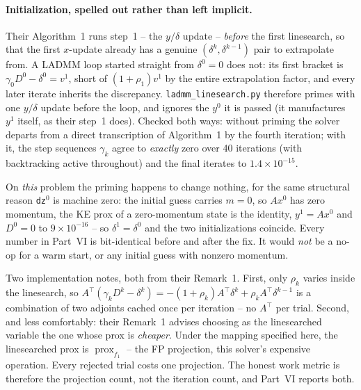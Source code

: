 \documentclass[11pt]{article}
\newcommand{\code}[1]{\texttt{#1}}
\newcommand{\prox}{\operatorname{prox}}
\begin{document}
\paragraph{Initialization, spelled out rather than left implicit.} Their
Algorithm~1 runs step~1 -- the $y/\delta$ update -- \emph{before} the first
linesearch, so that the first $x$-update already has a genuine
$(\delta^k,\delta^{k-1})$ pair to extrapolate from. A LADMM loop started
straight from $\delta^0=0$ does not: its first bracket is
$\gamma_0D^0-\delta^0=v^1$, short of $(1+\rho_1)v^1$ by the entire
extrapolation factor, and every later iterate inherits the discrepancy.
\code{ladmm\_linesearch.py} therefore primes with one $y/\delta$ update before
the loop, and ignores the $y^0$ it is passed (it manufactures $y^1$ itself, as
their step~1 does). Checked both ways: without priming the solver departs from a
direct transcription of Algorithm~1 by the fourth iteration; with it, the step
sequences $\gamma_k$ agree to \emph{exactly} zero over 40 iterations (with
backtracking active throughout) and the final iterates to $1.4\times10^{-15}$.

On \emph{this} problem the priming happens to change nothing, for the same
structural reason \code{dz}$^0$ is machine zero: the initial guess carries
$m=0$, so $Ax^0$ has zero momentum, the KE prox of a zero-momentum state is the
identity, $y^1=Ax^0$ and $D^0=0$ to $9\times10^{-16}$ -- so $\delta^1=\delta^0$
and the two initializations coincide. Every number in Part~VI is bit-identical
before and after the fix. It would \emph{not} be a no-op for a warm start, or
any initial guess with nonzero momentum.

Two implementation notes, both from their Remark~1. First, only $\rho_k$ varies
inside the linesearch, so $A^\top(\gamma_kD^k-\delta^k)=-(1+\rho_k)A^\top\delta^k+\rho_kA^\top\delta^{k-1}$
is a combination of two adjoints cached once per iteration -- no $A^\top$ per
trial. Second, and less comfortably: their Remark~1 advises choosing as the
linesearched variable the one whose prox is \emph{cheaper}. Under the mapping
specified here, the linesearched prox is $\prox_{f_1}$ -- the FP projection,
this solver's expensive operation. Every rejected trial costs one projection.
The honest work metric is therefore the projection count, not the iteration
count, and Part~VI reports both.
\end{document}

